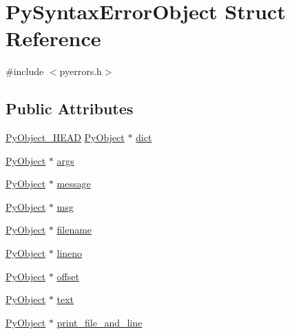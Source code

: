 \hypertarget{struct_py_syntax_error_object}{}\section{Py\+Syntax\+Error\+Object Struct Reference}
\label{struct_py_syntax_error_object}


{\ttfamily \#include $<$pyerrors.\+h$>$}

\subsection*{Public Attributes}
\begin{DoxyCompactItemize}
\item 
\mbox{\hyperlink{_python27_2object_8h_a0bf35c1f3ea13f925de94d8593db3b7e}{Py\+Object\+\_\+\+H\+E\+AD}} \mbox{\hyperlink{_python27_2object_8h_aadc84ac7aed2cfa6f20c25f62bf3dac7}{Py\+Object}} $\ast$ \mbox{\hyperlink{struct_py_syntax_error_object_add421cb74568917d40dbb80577959429}{dict}}
\item 
\mbox{\hyperlink{_python27_2object_8h_aadc84ac7aed2cfa6f20c25f62bf3dac7}{Py\+Object}} $\ast$ \mbox{\hyperlink{struct_py_syntax_error_object_a12644869b51ae4ba4fa67e6b66e56f8c}{args}}
\item 
\mbox{\hyperlink{_python27_2object_8h_aadc84ac7aed2cfa6f20c25f62bf3dac7}{Py\+Object}} $\ast$ \mbox{\hyperlink{struct_py_syntax_error_object_a2ff7a7bf5772dcd2bf74041b0ee622ed}{message}}
\item 
\mbox{\hyperlink{_python27_2object_8h_aadc84ac7aed2cfa6f20c25f62bf3dac7}{Py\+Object}} $\ast$ \mbox{\hyperlink{struct_py_syntax_error_object_a42c9f23126bc9c5fddcbf9631401617c}{msg}}
\item 
\mbox{\hyperlink{_python27_2object_8h_aadc84ac7aed2cfa6f20c25f62bf3dac7}{Py\+Object}} $\ast$ \mbox{\hyperlink{struct_py_syntax_error_object_aed7ca919fca31f79cda28d1cb0d62755}{filename}}
\item 
\mbox{\hyperlink{_python27_2object_8h_aadc84ac7aed2cfa6f20c25f62bf3dac7}{Py\+Object}} $\ast$ \mbox{\hyperlink{struct_py_syntax_error_object_a518424d9f51fde459c23101d19e49c85}{lineno}}
\item 
\mbox{\hyperlink{_python27_2object_8h_aadc84ac7aed2cfa6f20c25f62bf3dac7}{Py\+Object}} $\ast$ \mbox{\hyperlink{struct_py_syntax_error_object_a0cb77b0acc909058c6c74cfdaa1ffdda}{offset}}
\item 
\mbox{\hyperlink{_python27_2object_8h_aadc84ac7aed2cfa6f20c25f62bf3dac7}{Py\+Object}} $\ast$ \mbox{\hyperlink{struct_py_syntax_error_object_aebd47dd29210b4107549874ee2253ede}{text}}
\item 
\mbox{\hyperlink{_python27_2object_8h_aadc84ac7aed2cfa6f20c25f62bf3dac7}{Py\+Object}} $\ast$ \mbox{\hyperlink{struct_py_syntax_error_object_a2680fe45d034e0d79c6395787b0186dd}{print\+\_\+file\+\_\+and\+\_\+line}}
\end{DoxyCompactItemize}


